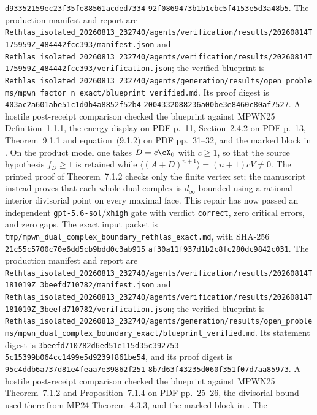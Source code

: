 \begin{enumerate}
  \texttt{d93352159ec23f35fe88561acded7334}\allowbreak
  \texttt{92f0869473b1b1cbc5f4153e5d3a48b5}.  The production manifest and report are
  \nolinkurl{Rethlas_isolated_20260813_232740/agents/verification/results/20260814T175959Z_484442fcc393/manifest.json}
  and
  \nolinkurl{Rethlas_isolated_20260813_232740/agents/verification/results/20260814T175959Z_484442fcc393/verification.json}; the verified blueprint
  is
  \nolinkurl{Rethlas_isolated_20260813_232740/agents/generation/results/open_problems/mpwn_factor_n_exact/blueprint_verified.md}.
  Its proof digest is
  \texttt{403ac2a601abe51c1d0b4a8852f52b4}\allowbreak
  \texttt{2004332088236a00be3e8460c80af7527}.  A hostile post-receipt comparison
  checked the blueprint against MPWN25 Definition~1.1.1, the energy display
  on PDF p.~11, Section~2.4.2 on PDF p.~13, Theorem~9.1.1 and
  equation~(9.1.2) on PDF pp.~31--32, and the marked block in
  .  On the product model one takes
  \(D=c\cX_0\) with \(c\geq1\), so that the source hypothesis
  \(f_D\geq1\) is retained while
  \(\langle(A+D)^{n+1}\rangle=(n+1)cV\ne0\).
  The printed proof of Theorem~7.1.2 checks only the finite vertex set;
  the manuscript instead proves that each whole dual complex is
  \(d_\infty\)-bounded using a rational interior divisorial point on every
  maximal face.  This repair has now passed an independent
  \texttt{gpt-5.6-sol}/\texttt{xhigh} gate with verdict \texttt{correct},
  zero critical errors, and zero gaps.  The exact input packet is
  \nolinkurl{tmp/mpwn_dual_complex_boundary_rethlas_exact.md}, with SHA-256
  \texttt{21c55c5700c70e6dd5cb9bdd0c3ab915}
  \allowbreak\texttt{af30a11f937d1b2c8fc280dc9842c031}.  The production manifest and report are
  \nolinkurl{Rethlas_isolated_20260813_232740/agents/verification/results/20260814T181019Z_3beefd710782/manifest.json}
  and
  \nolinkurl{Rethlas_isolated_20260813_232740/agents/verification/results/20260814T181019Z_3beefd710782/verification.json}; the verified blueprint is
  \nolinkurl{Rethlas_isolated_20260813_232740/agents/generation/results/open_problems/mpwn_dual_complex_boundary_exact/blueprint_verified.md}.
  Its statement digest is
  \texttt{3beefd710782d6ed51e115d35c392753}
  \allowbreak\texttt{5c15399b064cc1499e5d9239f861be54}, and its proof digest is
  \texttt{95c4ddb6a737d81e4feaa7e39862f251}
  \allowbreak\texttt{8b7d63f43235d060f351f07d7aa85973}.  A hostile post-receipt
  comparison checked the blueprint against MPWN25 Theorem~7.1.2 and
  Proposition~7.1.4 on PDF pp.~25--26, the divisorial bound used there from
  MP24 Theorem~4.3.3, and the marked block in .  The

\end{enumerate}
